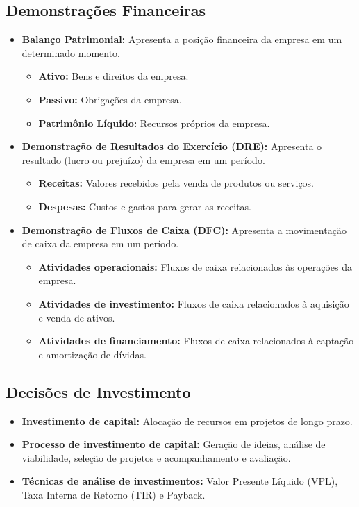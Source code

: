 \documentclass{article}
\begin{document}
\subsection{Demonstrações Financeiras}
\begin{itemize}
    \item \textbf{Balanço Patrimonial:} Apresenta a posição financeira da empresa em um determinado momento. 
    \begin{itemize}
        \item \textbf{Ativo:} Bens e direitos da empresa. 
        \item \textbf{Passivo:} Obrigações da empresa. 
        \item \textbf{Patrimônio Líquido:} Recursos próprios da empresa. 
    \end{itemize}
    \item \textbf{Demonstração de Resultados do Exercício (DRE):} Apresenta o resultado (lucro ou prejuízo) da empresa em um período. 
    \begin{itemize}
        \item \textbf{Receitas:} Valores recebidos pela venda de produtos ou serviços. 
        \item \textbf{Despesas:} Custos e gastos para gerar as receitas. 
    \end{itemize}
    \item \textbf{Demonstração de Fluxos de Caixa (DFC):} Apresenta a movimentação de caixa da empresa em um período. 
    \begin{itemize}
        \item \textbf{Atividades operacionais:} Fluxos de caixa relacionados às operações da empresa. 
        \item \textbf{Atividades de investimento:} Fluxos de caixa relacionados à aquisição e venda de ativos. 
        \item \textbf{Atividades de financiamento:} Fluxos de caixa relacionados à captação e amortização de dívidas. 
    \end{itemize}
\end{itemize}

\subsection{Decisões de Investimento}
\begin{itemize}
    \item \textbf{Investimento de capital:} Alocação de recursos em projetos de longo prazo. 
    \item \textbf{Processo de investimento de capital:} Geração de ideias, análise de viabilidade, seleção de projetos e acompanhamento e avaliação. 
    \item \textbf{Técnicas de análise de investimentos:} Valor Presente Líquido (VPL), Taxa Interna de Retorno (TIR) e Payback. 
\end{itemize}
\end{document}
